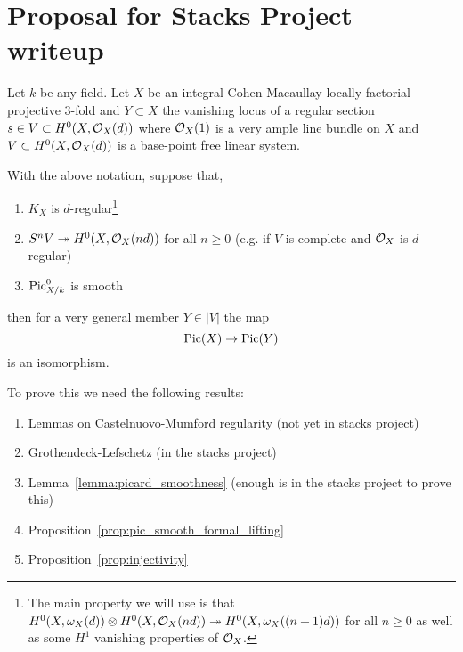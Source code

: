 \documentclass[12pt]{article}
\begin{document}
\section{Proposal for Stacks Project writeup}

Let $k$ be any field. Let $X$ be an integral Cohen-Macaullay locally-factorial projective 3-fold and $Y \subset X$ the vanishing locus of a regular section $s \in V \subset H^0(X, \mathcal{O}_{X}(d))$ where $\mathcal{O}_{X}(1)$ is a very ample line bundle on $X$ and $V \subset H^0(X, \mathcal{O}_{X}(d))$ is a base-point free linear system. 

\begin{theorem}
With the above notation, suppose that,
\begin{enumerate}
\item $K_X$ is $d$-regular\footnote{The main property we will use is that $H^0(X, \omega_X(d)) \otimes H^0(X, \mathcal{O}_{X}(nd)) \twoheadrightarrow H^0(X, \omega_X((n+1)d))$ for all $n \ge 0$ as well as some $H^1$ vanishing properties of $\mathcal{O}_{X}$.}
\item $S^n V \twoheadrightarrow H^0(X, \mathcal{O}_{X}(nd))$ for all $n \ge 0$ (e.g. if $V$ is complete and $\mathcal{O}_{X}$ is $d$-regular)
\item $\mathrm{Pic}_{X/k}^0$ is smooth
\end{enumerate}
then for a very general member $Y \in |V|$ the map
\[ \mathrm{Pic}(X) \to \mathrm{Pic}(Y) \]
is an isomorphism. 
\end{theorem}

To prove this we need the following results:

\begin{enumerate}
\item Lemmas on Castelnuovo-Mumford regularity (not yet in stacks project)

\item Grothendeck-Lefschetz (in the stacks project)

\item Lemma~\ref{lemma:picard_smoothness} (enough is in the stacks project to prove this)

\item Proposition~\ref{prop:pic_smooth_formal_lifting}

\item Proposition~\ref{prop:injectivity}
\end{enumerate}
\end{document}
